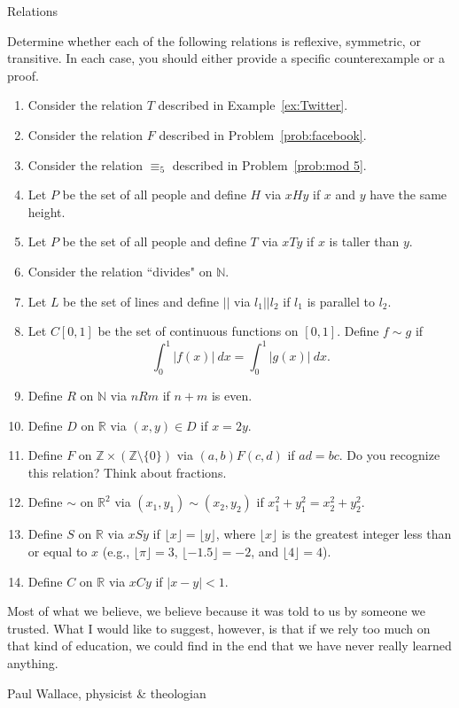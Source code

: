 \begin{section}{Relations}
\begin{problem}\label{prob:lots of relations}
Determine whether each of the following relations is reflexive, symmetric, or transitive. In each case, you should either provide a specific counterexample or a proof.
\begin{enumerate}[label=\textrm{(\alph*)}]
\item Consider the relation $T$ described in Example~\ref{ex:Twitter}.
\item Consider the relation $F$ described in Problem~\ref{prob:facebook}.
\item Consider the relation $\equiv_5$ described in Problem~\ref{prob:mod 5}.
\item Let $P$ be the set of all people and define $H$ via $xHy$ if $x$ and $y$ have the same height.
\item Let $P$ be the set of all people and define $T$ via $xTy$ if $x$ is taller than $y$.
\item Consider the relation ``divides" on $\mathbb{N}$.
\item Let $L$ be the set of lines and define $||$ via $l_1||l_2$ if $l_1$ is parallel to $l_2$.
\item Let $C[0,1]$ be the set of continuous functions on $[0,1]$.  Define $f\sim g$ if
\[
\int_0^1|f(x)|\ dx=\int_0^1|g(x)|\ dx.
\]
\item Define $R$ on $\mathbb{N}$ via $nR m$ if $n+m$ is even.
\item Define $D$ on $\mathbb{R}$ via $(x,y)\in D$ if $x=2y$.
\item Define $F$ on $\mathbb{Z}\times \left(\mathbb{Z}\setminus \{0\}\right)$ via $(a,b)F(c,d)$ if $ad=bc$. Do you recognize this relation? Think about fractions.
\item Define $\sim$ on $\mathbb{R}^2$ via $(x_1,y_1)\sim (x_2,y_2)$ if $x_1^2+y_1^2=x_2^2+y_2^2$.
\item Define $S$ on $\mathbb{R}$ via $xS y$ if $\lfloor x\rfloor =\lfloor y\rfloor$, where $\lfloor x\rfloor$ is the greatest integer less than or equal to $x$ (e.g., $\lfloor \pi\rfloor=3$, $\lfloor -1.5\rfloor=-2$, and $\lfloor 4\rfloor=4$).
\item Define $C$ on $\mathbb{R}$ via $xCy$ if $|x-y|<1$.
\end{enumerate}
\end{problem}

\epigraph{Most of what we believe, we believe because it was told to us by someone we trusted. What I would like to suggest, however, is that if we rely too much on that kind of education, we could find in the end that we have never really learned anything.}{Paul Wallace, physicist \& theologian}

\end{section}